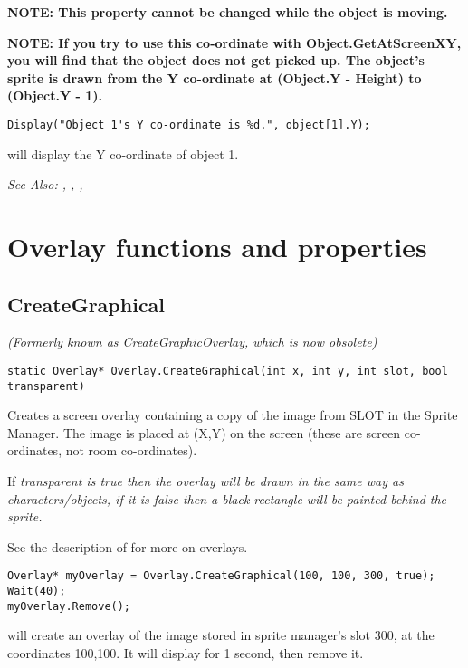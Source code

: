 \bf{NOTE:} This property cannot be changed while the object is moving.

\bf{NOTE:} If you try to use this co-ordinate with Object.GetAtScreenXY, you will find that
the object does not get picked up. The object's sprite is drawn from the Y co-ordinate
at (Object.Y - Height) to (Object.Y - 1).

\begin{verbatim}
Display("Object 1's Y co-ordinate is %d.", object[1].Y);
\end{verbatim}
will display the Y co-ordinate of object 1.

\it{See Also:} ,
, ,




\section{Overlay functions and properties}%


\subsection{CreateGraphical}\label{Overlay.CreateGraphical}%

\it{(Formerly known as CreateGraphicOverlay, which is now obsolete)}

\begin{verbatim}
static Overlay* Overlay.CreateGraphical(int x, int y, int slot, bool transparent)
\end{verbatim}
Creates a screen overlay containing a copy of the image from SLOT in
the Sprite Manager. The image is placed at (X,Y) on the screen (these are
screen co-ordinates, not room co-ordinates).

If \it{transparent} is true then the overlay will be drawn in the
same way as characters/objects, if it is false
then a black rectangle will be painted behind the sprite.

See the description of  for more on overlays.

\begin{verbatim}
Overlay* myOverlay = Overlay.CreateGraphical(100, 100, 300, true);
Wait(40);
myOverlay.Remove();
\end{verbatim}
will create an overlay of the image stored in sprite manager's slot 300, at the
coordinates 100,100. It will display for 1 second, then remove it.

